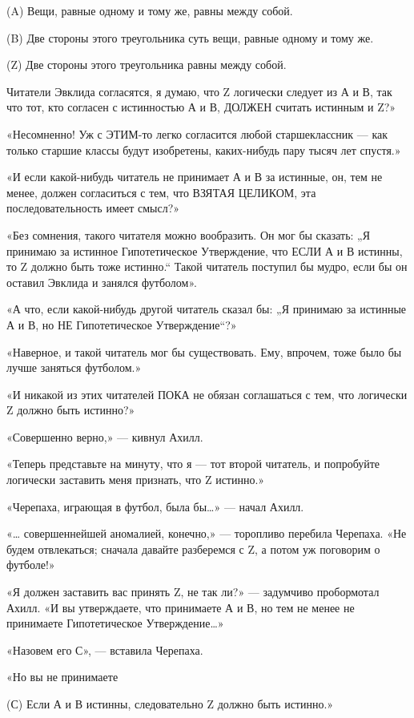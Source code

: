 (A) Вещи, равные одному и тому же, равны между собой.

(B) Две стороны этого треугольника суть вещи, равные одному и тому же.

(Z) Две стороны этого треугольника равны между собой.

Читатели Эвклида согласятся, я думаю, что Z логически следует из А и В, так что тот, кто согласен с истинностью А и В, ДОЛЖЕН считать истинным и Z?»

«Несомненно! Уж с ЭТИМ-то легко согласится любой старшеклассник --- как только старшие классы будут изобретены, каких-нибудь пару тысяч лет спустя.»

«И если какой-нибудь читатель не принимает А и В за истинные, он, тем не менее, должен согласиться с тем, что ВЗЯТАЯ ЦЕЛИКОМ, эта последовательность имеет смысл?»

«Без сомнения, такого читателя можно вообразить. Он мог бы сказать: „Я принимаю за истинное Гипотетическое Утверждение, что ЕСЛИ А и В истинны, то Z должно быть тоже истинно.`` Такой читатель поступил бы мудро, если бы он оставил Эвклида и занялся футболом».

«А что, если какой-нибудь другой читатель сказал бы: „Я принимаю за истинные А и В, но НЕ Гипотетическое Утверждение``?»

«Наверное, и такой читатель мог бы существовать. Ему, впрочем, тоже было бы лучше заняться футболом.»

«И никакой из этих читателей ПОКА не обязан соглашаться с тем, что логически Z должно быть истинно?»

«Совершенно верно,» --- кивнул Ахилл.

«Теперь представьте на минуту, что я --- тот второй читатель, и попробуйте логически заставить меня признать, что Z истинно.»

«Черепаха, играющая в футбол, была бы\ldots» --- начал Ахилл.

«\ldots{} совершеннейшей аномалией, конечно,» --- торопливо перебила Черепаха. «Не будем отвлекаться; сначала давайте разберемся с Z, а потом уж поговорим о футболе!»

«Я должен заставить вас принять Z, не так ли?» --- задумчиво пробормотал Ахилл. «И вы утверждаете, что принимаете А и В, но тем не менее не принимаете Гипотетическое Утверждение\ldots»

«Назовем его С», --- вставила Черепаха.

«Но вы не принимаете

(С) Если А и В истинны, следовательно Z должно быть истинно.»

